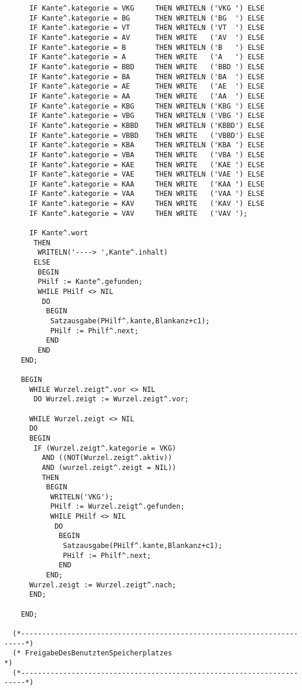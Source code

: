\documentclass[12pt]{article}
\begin{document}
\begin{verbatim}
      IF Kante^.kategorie = VKG     THEN WRITELN ('VKG ') ELSE
      IF Kante^.kategorie = BG      THEN WRITELN ('BG  ') ELSE
      IF Kante^.kategorie = VT      THEN WRITELN ('VT  ') ELSE
      IF Kante^.kategorie = AV      THEN WRITE   ('AV  ') ELSE
      IF Kante^.kategorie = B       THEN WRITELN ('B   ') ELSE
      IF Kante^.kategorie = A       THEN WRITE   ('A   ') ELSE
      IF Kante^.kategorie = BBD     THEN WRITE   ('BBD ') ELSE
      IF Kante^.kategorie = BA      THEN WRITELN ('BA  ') ELSE
      IF Kante^.kategorie = AE      THEN WRITE   ('AE  ') ELSE
      IF Kante^.kategorie = AA      THEN WRITE   ('AA  ') ELSE
      IF Kante^.kategorie = KBG     THEN WRITELN ('KBG ') ELSE
      IF Kante^.kategorie = VBG     THEN WRITELN ('VBG ') ELSE
      IF Kante^.kategorie = KBBD    THEN WRITELN ('KBBD') ELSE
      IF Kante^.kategorie = VBBD    THEN WRITE   ('VBBD') ELSE
      IF Kante^.kategorie = KBA     THEN WRITELN ('KBA ') ELSE
      IF Kante^.kategorie = VBA     THEN WRITE   ('VBA ') ELSE
      IF Kante^.kategorie = KAE     THEN WRITE   ('KAE ') ELSE
      IF Kante^.kategorie = VAE     THEN WRITELN ('VAE ') ELSE
      IF Kante^.kategorie = KAA     THEN WRITE   ('KAA ') ELSE
      IF Kante^.kategorie = VAA     THEN WRITE   ('VAA ') ELSE
      IF Kante^.kategorie = KAV     THEN WRITE   ('KAV ') ELSE
      IF Kante^.kategorie = VAV     THEN WRITE   ('VAV ');

      IF Kante^.wort
       THEN
        WRITELN('----> ',Kante^.inhalt)
       ELSE
        BEGIN
        PHilf := Kante^.gefunden;
        WHILE PHilf <> NIL
         DO
          BEGIN
           Satzausgabe(PHilf^.kante,Blankanz+c1);
           PHilf := Philf^.next;
          END
        END
    END;

    BEGIN
      WHILE Wurzel.zeigt^.vor <> NIL
       DO Wurzel.zeigt := Wurzel.zeigt^.vor;

      WHILE Wurzel.zeigt <> NIL
      DO
      BEGIN
       IF (Wurzel.zeigt^.kategorie = VKG)
         AND ((NOT(Wurzel.zeigt^.aktiv))
         AND (wurzel.zeigt^.zeigt = NIL))
         THEN
          BEGIN
           WRITELN('VKG');
           PHilf := Wurzel.zeigt^.gefunden;
           WHILE PHilf <> NIL
            DO
             BEGIN
              Satzausgabe(PHilf^.kante,Blankanz+c1);
              PHilf := Philf^.next;
             END
          END;
      Wurzel.zeigt := Wurzel.zeigt^.nach;
      END;

    END;

  (*-----------------------------------------------------------------------*)
  (* FreigabeDesBenutztenSpeicherplatzes                                   *)
  (*-----------------------------------------------------------------------*)


\end{verbatim}
\end{document}
